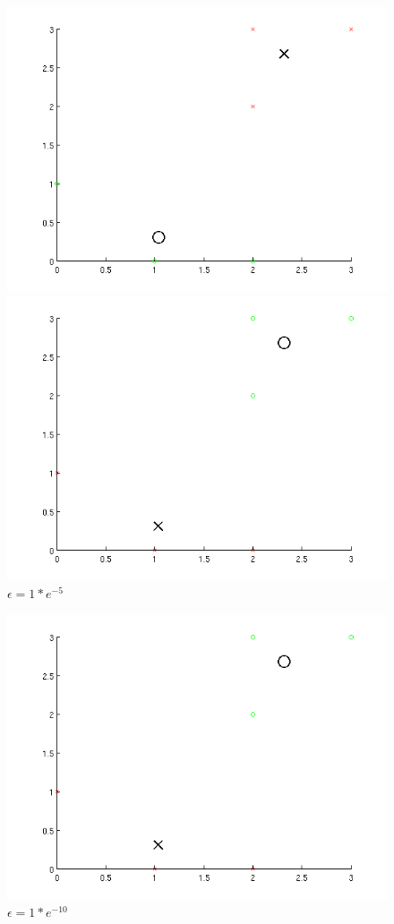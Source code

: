\begin{figure}[h]
  \begin{minipage}[b]{0.5\linewidth}
    \centering
    \includegraphics[width=1\linewidth]{../img/data7b2e2.png}
    \caption{$\epsilon = 1*e^{-2}$}
  \end{minipage}
  \begin{minipage}[b]{0.5\linewidth}
    \centering
    \includegraphics[width=1\linewidth]{../img/data7b2e5.png}
    \caption{$\epsilon = 1*e^{-5}$}	
  \end{minipage}
\end{figure}
\begin{figure}[h]
    \centering
    \includegraphics[width=0.5\linewidth]{../img/data7b2e10.png}
    \caption{$\epsilon = 1*e^{-10}$}
\end{figure}

